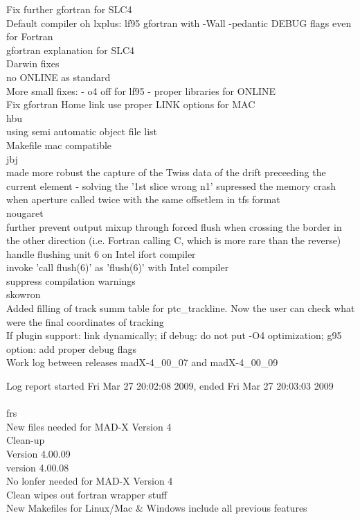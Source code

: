Fix further gfortran for SLC4  \\ 
Default compiler oh lxplus: lf95 gfortran with -Wall -pedantic DEBUG flags even for Fortran  \\ 
gfortran explanation for SLC4  \\ 
Darwin fixes  \\ 
no ONLINE as standard  \\ 
More small fixes: - o4 off for lf95 - proper libraries for ONLINE  \\ 
Fix gfortran Home link use proper LINK options for MAC  \\ 
hbu \\ 
using semi automatic object file list  \\ 
Makefile mac compatible  \\ 
jbj \\ 
made more robust the capture of the Twiss data of the drift preceeding the current element - solving the '1st slice wrong n1'  supressed the memory crash when aperture called twice with the same offsetlem in tfs format  \\ 
nougaret \\ 
further prevent output mixup through forced flush when crossing the border in the other direction (i.e. Fortran calling C, which is more rare than the reverse)  \\ 
handle flushing unit 6 on Intel ifort compiler  \\ 
invoke 'call flush(6)' as 'flush(6)' with Intel compiler  \\ 
suppress compilation warnings  \\ 
skowron \\ 
Added filling of track summ table for ptc\_trackline. Now the user can check what were the final coordinates of tracking  \\ 
If plugin support: link dynamically; if debug: do not put -O4 optimization; g95 option: add proper debug flags 
\\

Work log between releases madX-4\_00\_07 and madX-4\_00\_09 

Log report started Fri Mar 27 20:02:08 2009, ended Fri Mar 27 20:03:03 2009
\\
\\
frs \\ 
New files needed for MAD-X Version 4  \\ 
Clean-up  \\ 
Version 4.00.09  \\ 
version 4.00.08  \\ 
No lonfer needed for MAD-X Version 4  \\ 
Clean wipes out fortran wrapper stuff  \\ 
New Makefiles for Linux/Mac \& Windows include all previous features 
\\

